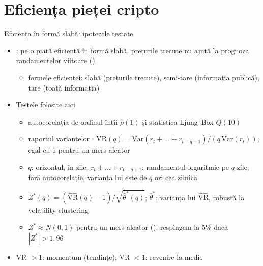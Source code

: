 \section{Eficiența pieței cripto}

\begin{frame}{Eficiența în formă slabă: ipotezele testate}
\itemsize{\small}
\begin{itemize}
    \item {}: pe o piață eficientă în formă slabă, prețurile trecute nu ajută la prognoza randamentelor viitoare ()
    \begin{itemize}
        \item formele eficienței: slabă (prețurile trecute), semi-tare (informația publică), tare (toată informația)
    \end{itemize}
    \item Testele folosite aici
    \begin{itemize}
        \item autocorelația de ordinul întîi $\hat\rho(1)$ și statistica Ljung--Box $Q(10)$
        \item raportul varianțelor : $\mathrm{VR}(q) = \mathrm{Var}(r_t + \dots + r_{t-q+1})/(q\,\mathrm{Var}(r_t))$, egal cu 1 pentru un mers aleator
        \item $q$: orizontul, în zile; $r_t + \dots + r_{t-q+1}$: randamentul logaritmic pe $q$ zile; fără autocorelație, varianța lui este de $q$ ori cea zilnică
        \item $Z^*(q) = (\widehat{\mathrm{VR}}(q) - 1)/\sqrt{\hat\theta^*(q)}$; $\hat\theta^*$: varianța lui $\widehat{\mathrm{VR}}$, robustă la volatility clustering
        \item $Z^* \approx N(0, 1)$ pentru un mers aleator (); respingem la 5\% dacă $|Z^*| > 1{,}96$
    \end{itemize}
    \item VR $> 1$: momentum (tendințe); VR $< 1$: revenire la medie
\end{itemize}
\end{frame}

